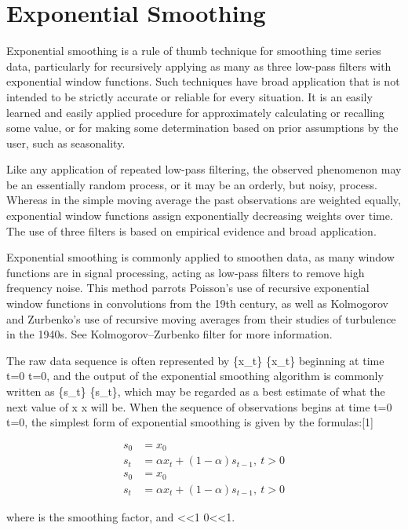 \section*{Exponential Smoothing}
Exponential smoothing is a rule of thumb technique for smoothing time series data, particularly for recursively applying as many as three low-pass filters with exponential window functions. Such techniques have broad application that is not intended to be strictly accurate or reliable for every situation. It is an easily learned and easily applied procedure for approximately calculating or recalling some value, or for making some determination based on prior assumptions by the user, such as seasonality. 

Like any application of repeated low-pass filtering, the observed phenomenon may be an essentially random process, or it may be an orderly, but noisy, process. Whereas in the simple moving average the past observations are weighted equally, exponential window functions assign exponentially decreasing weights over time. The use of three filters is based on empirical evidence and broad application.

Exponential smoothing is commonly applied to smoothen data, as many window functions are in signal processing, acting as low-pass filters to remove high frequency noise. This method parrots Poisson's use of recursive exponential window functions in convolutions from the 19th century, as well as Kolmogorov and Zurbenko's use of recursive moving averages from their studies of turbulence in the 1940s. See Kolmogorov–Zurbenko filter for more information.

The raw data sequence is often represented by {\displaystyle \{x_{t}\}} \{x_{t}\} beginning at time {\displaystyle t=0} t=0, and the output of the exponential smoothing algorithm is commonly written as {\displaystyle \{s_{t}\}} \{s_{t}\}, which may be regarded as a best estimate of what the next value of {\displaystyle x} x will be. When the sequence of observations begins at time {\displaystyle t=0} t=0, the simplest form of exponential smoothing is given by the formulas:[1]

\[{\displaystyle {\begin{aligned}s_{0}&=x_{0}\\s_{t}&=\alpha x_{t}+(1-\alpha )s_{t-1},\ t>0\end{aligned}}}\] \[{\begin{aligned}s_{0}&=x_{0}\\s_{t}&=\alpha x_{t}+(1-\alpha )s_{t-1},\ t>0\end{aligned}}\]

where {\displaystyle \alpha } \alpha  is the smoothing factor, and {<\alpha <1} 0<\alpha <1.


